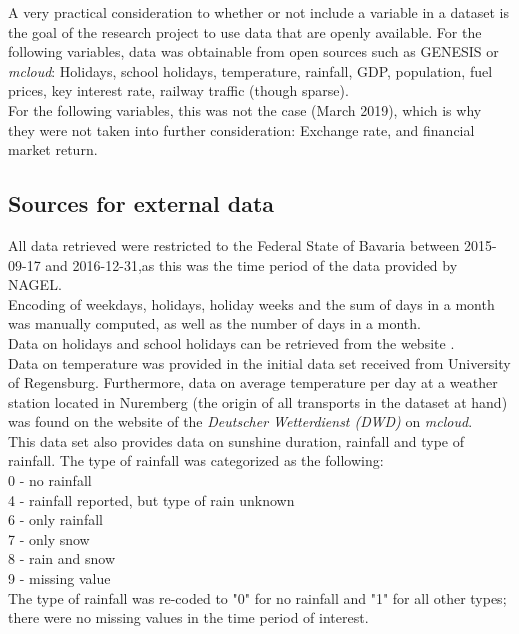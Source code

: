 \documentclass[a4paper, 11pt]{article}
\begin{document}
A very practical consideration to whether or not include a variable in a dataset is the goal of the research project to use data that are openly available.
For the following variables, data was obtainable from open sources such as GENESIS \citep{StatistischesBundesamt.2019} or \textit{mcloud}: Holidays, school holidays, temperature, rainfall, GDP, population, fuel prices, key interest rate, railway traffic (though sparse).\\
For the following variables, this was not the case (March 2019), which is why they were not taken into further consideration: Exchange rate, and financial market return. 

\subsection{Sources for external data}

All data retrieved were restricted to the Federal State of Bavaria between 2015-09-17 and 2016-12-31,as this was the time period of the data provided by NAGEL.\\

Encoding of weekdays, holidays, holiday weeks and the sum of days in a month was manually computed, as well as the number of days in a month.\\
Data on holidays and school holidays can be retrieved from the website \href{schulferien.org} \citep{.b}.\\

Data on temperature was provided in the initial data set received from University of Regensburg. Furthermore, data on average temperature per day at a weather station located in Nuremberg (the origin of all transports in the dataset at hand) was found on the website of the \textit{Deutscher Wetterdienst (DWD)} on \textit{mcloud}.\\
This data set also provides data on sunshine duration, rainfall and type of rainfall. The type of rainfall was categorized as the following:\\
0 - no rainfall\\
4 - rainfall reported, but type of rain unknown\\
6 - only rainfall \\
7 - only snow\\
8 - rain and snow\\
9 - missing value\\
The type of rainfall was re-coded to "0" for no rainfall and "1" for all other types; there were no missing values in the time period of interest.\\
\end{document}
